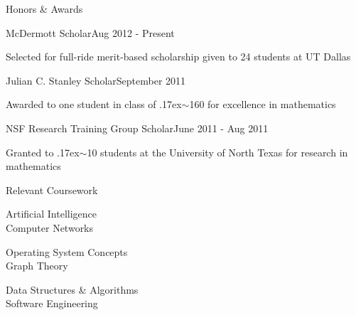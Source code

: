 \documentclass{resume} %
\begin{document}
\begin{rSection}{Honors \& Awards}

\begin{honors_section}{McDermott Scholar}{Aug 2012 - Present}
\item Selected for full-ride merit-based scholarship given to 24 students at UT Dallas
\end{honors_section}

\begin{honors_section}{Julian C. Stanley Scholar}{September 2011}
\item Awarded to one student in class of {\raise.17ex\hbox{$\scriptstyle\sim$}}160 for excellence in mathematics
\end{honors_section}

\begin{honors_section}{NSF Research Training Group Scholar}{June 2011 - Aug 2011}
\item Granted to {\raise.17ex\hbox{$\scriptstyle\sim$}}10 students at the University of North Texas for research in mathematics
\end{honors_section}



\end{rSection}

\begin{rSection}[0em]{Relevant Coursework}

\begin{minipage}{0.33\textwidth}
\centering
Artificial Intelligence\\
Computer Networks
\end{minipage}%
\begin{minipage}{0.33\textwidth}
\centering
Operating System Concepts\\
Graph Theory
\end{minipage}%
\begin{minipage}{0.33\textwidth}
\centering
Data Structures \& Algorithms\\
Software Engineering
\end{minipage}

\end{rSection}
\end{document}
